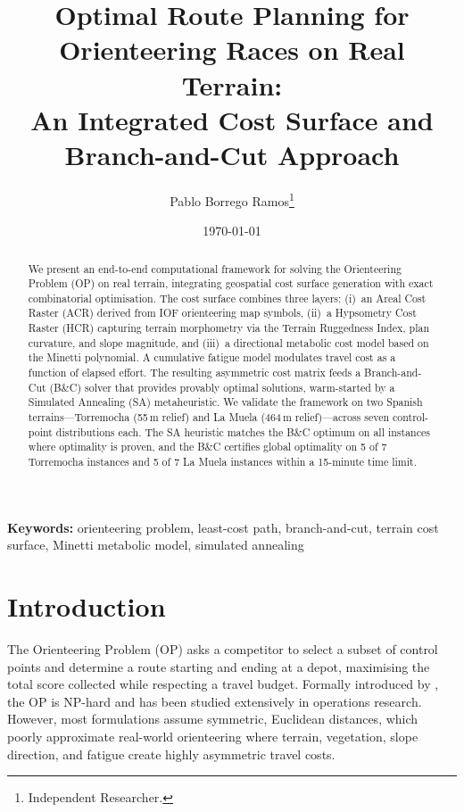 \documentclass[11pt,a4paper]{article}
\title{Optimal Route Planning for Orienteering Races on Real Terrain:\\
An Integrated Cost Surface and Branch-and-Cut Approach}
\author{
  Pablo Borrego Ramos\thanks{Independent Researcher.}
}
\date{\today}
\begin{document}
\maketitle

\begin{abstract}
We present an end-to-end computational framework for solving the Orienteering Problem (OP) on real terrain, integrating geospatial cost surface generation with exact combinatorial optimisation.
The cost surface combines three layers: (i)~an Areal Cost Raster (ACR) derived from IOF orienteering map symbols, (ii)~a Hypsometry Cost Raster (HCR) capturing terrain morphometry via the Terrain Ruggedness Index, plan curvature, and slope magnitude, and (iii)~a directional metabolic cost model based on the Minetti polynomial.
A cumulative fatigue model modulates travel cost as a function of elapsed effort.
The resulting asymmetric cost matrix feeds a Branch-and-Cut (B\&C) solver that provides provably optimal solutions, warm-started by a Simulated Annealing (SA) metaheuristic.
We validate the framework on two Spanish terrains---Torremocha (55\,m relief) and La Muela (464\,m relief)---across seven control-point distributions each.
The SA heuristic matches the B\&C optimum on all instances where optimality is proven, and the B\&C certifies global optimality on 5 of 7 Torremocha instances and 5 of 7 La Muela instances within a 15-minute time limit.
\end{abstract}

\noindent\textbf{Keywords:} orienteering problem, least-cost path, branch-and-cut, terrain cost surface, Minetti metabolic model, simulated annealing

\section{Introduction}
\label{sec:intro}

The Orienteering Problem (OP) asks a competitor to select a subset of control points and determine a route starting and ending at a depot, maximising the total score collected while respecting a travel budget.
Formally introduced by \citet{tsiligirides1984heuristic}, the OP is NP-hard and has been studied extensively in operations research.
However, most formulations assume symmetric, Euclidean distances, which poorly approximate real-world orienteering where terrain, vegetation, slope direction, and fatigue create highly asymmetric travel costs.
\end{document}
